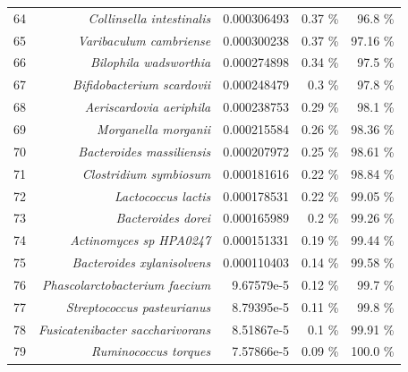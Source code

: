 \documentclass{article}
\begin{document}
\begin{table}
\begin{tabular}{|r|r|r|r|r|}
      64 & \textit{Collinsella intestinalis} & 0.000306493 & 0.37 \% & 96.8 \% \\
      65 & \textit{Varibaculum cambriense} & 0.000300238 & 0.37 \% & 97.16 \% \\
      66 & \textit{Bilophila wadsworthia} & 0.000274898 & 0.34 \% & 97.5 \% \\
      67 & \textit{Bifidobacterium scardovii} & 0.000248479 & 0.3 \% & 97.8 \% \\
      68 & \textit{Aeriscardovia aeriphila} & 0.000238753 & 0.29 \% & 98.1 \% \\
      69 & \textit{Morganella morganii} & 0.000215584 & 0.26 \% & 98.36 \% \\
      70 & \textit{Bacteroides massiliensis} & 0.000207972 & 0.25 \% & 98.61 \% \\
      71 & \textit{Clostridium symbiosum} & 0.000181616 & 0.22 \% & 98.84 \% \\
      72 & \textit{Lactococcus lactis} & 0.000178531 & 0.22 \% & 99.05 \% \\
      73 & \textit{Bacteroides dorei} & 0.000165989 & 0.2 \% & 99.26 \% \\
      74 & \textit{Actinomyces sp HPA0247} & 0.000151331 & 0.19 \% & 99.44 \% \\
      75 & \textit{Bacteroides xylanisolvens} & 0.000110403 & 0.14 \% & 99.58 \% \\
      76 & \textit{Phascolarctobacterium faecium} & 9.67579e-5 & 0.12 \% & 99.7 \% \\
      77 & \textit{Streptococcus pasteurianus} & 8.79395e-5 & 0.11 \% & 99.8 \% \\
      78 & \textit{Fusicatenibacter saccharivorans} & 8.51867e-5 & 0.1 \% & 99.91 \% \\
      79 & \textit{Ruminococcus torques} & 7.57866e-5 & 0.09 \% & 100.0 \% \\\hline\hline
    \end{tabular}
  \end{table}
\end{document}
